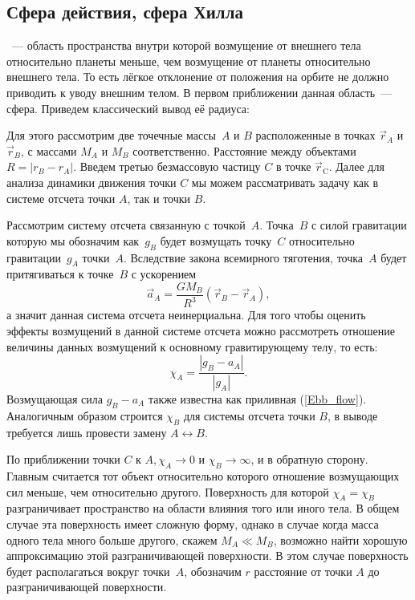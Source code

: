 \subsection{Сфера действия, сфера Хилла}
~--- область пространства внутри которой возмущение от внешнего тела относительно планеты меньше, чем возмущение от планеты относительно внешнего тела. То есть лёгкое отклонение от положения на орбите не должно приводить к уводу внешним телом. В первом приближении данная область~--- сфера. Приведем  классический вывод её радиуса:

Для этого рассмотрим две точечные массы~$A$ и $B$ расположенные в точках $\vec{r}_A$ и $\vec{r}_B$, с массами $M_A$ и $M_B$ соответственно. Расстояние между объектами $R=\left|r_B-r_A\right|$. Введем третью безмассовую частицу $C$ в точке $\vec{r}_{\text{C}}$. Далее для анализа динамики движения точки $C$ мы можем рассматривать задачу как в системе отсчета точки $A$, так и точки $B$.

Рассмотрим систему отсчета связанную с точкой~$A$. Точка~$B$ с силой гравитации которую мы обозначим как~$g_B$ будет возмущать точку~$C$ относительно гравитации~$g_A$ точки~$A$. Вследствие закона всемирного тяготения, точка~$A$ будет притягиваться к точке~$B$ с ускорением 
\begin{equation*}
    \vec{a}_A=\frac{G M_B}{R^3}\left(\vec{r}_B-\vec{r}_A\right),
\end{equation*}
а значит данная система отсчета неинерциальна. Для того чтобы оценить эффекты возмущений в данной системе отсчета можно рассмотреть отношение величины данных возмущений к основному гравитирующему телу, то есть:
\begin{equation*}
    \chi_A=\frac{\left|g_B-a_A\right|}{\left|g_A\right|}.
\end{equation*}
Возмущающая сила $g_B-a_A$ также известна как приливная (\ref{Ebb_flow}). Аналогичным образом строится $\chi_B$ для системы отсчета точки $B$, в выводе требуется лишь провести замену $A \leftrightarrow B$.

По приближении точки $C$ к $A, \chi_A \rightarrow 0$ и $\chi_B \rightarrow \infty$, и в обратную сторону. Главным считается тот объект относительно которого отношение возмущающих сил меньше, чем относительно другого. Поверхность для которой $\chi_A=\chi_B$ разграничивает пространство на области влияния того или иного тела. В общем случае эта поверхность имеет сложную форму, однако в случае когда масса одного тела много больше другого, скажем $M_A \ll M_B$, возможно найти хорошую аппроксимацию этой разграничивающей поверхности. В этом случае поверхность будет располагаться вокруг точки~$A$, обозначим $r$ расстояние от точки $A$ до разграничивающей поверхности.


